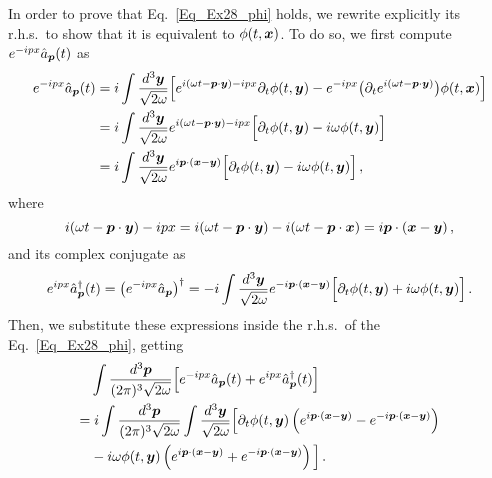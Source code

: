 \begin{sol}
    In order to prove that Eq.~\eqref{Eq_Ex28_phi} holds, we rewrite explicitly its r.h.s.~to show that it is equivalent to $\phi(t,\boldsymbol{x})$. To do so, we first compute $e^{-ipx} \hat{a}_{\boldsymbol{p}}(t)$ as
    \begin{equation}
    \begin{split}
        e^{-ipx} \hat{a}_{\boldsymbol{p}}(t) 
        = &\; i \int \frac{d^3 \boldsymbol{y}}{\sqrt{2\omega}} \Big[e^{i(\omega t - \boldsymbol{p} \cdot \boldsymbol{y}) - ipx} \partial_t  \phi(t,\boldsymbol{y}) - e^{- ipx}\big(\partial_t e^{i(\omega t - \boldsymbol{p} \cdot \boldsymbol{y})}\big) \phi(t,\boldsymbol{x})\Big] \\
        = &\; i \int \frac{d^3 \boldsymbol{y}}{\sqrt{2\omega}} e^{i(\omega t - \boldsymbol{p} \cdot \boldsymbol{y}) - ipx} \Big[\partial_t  \phi(t,\boldsymbol{y}) - i \omega \phi(t,\boldsymbol{y})\Big] \\
        = &\; i \int \frac{d^3 \boldsymbol{y}}{\sqrt{2\omega}} e^{i\boldsymbol{p} \cdot(\boldsymbol{x} - \boldsymbol{y})} \Big[\partial_t  \phi(t,\boldsymbol{y}) - i \omega \phi(t,\boldsymbol{y})\Big] \, ,
    \end{split}
    \end{equation}
    where
    \begin{equation}
        i(\omega t - \boldsymbol{p} \cdot \boldsymbol{y}) - ipx = i(\omega t - \boldsymbol{p} \cdot \boldsymbol{y}) - i(\omega t - \boldsymbol{p} \cdot \boldsymbol{x}) = i\boldsymbol{p} \cdot(\boldsymbol{x} - \boldsymbol{y}) \, ,
    \end{equation}
    and its complex conjugate as
    \begin{equation}
        e^{ipx} \hat{a}^\dagger_{\boldsymbol{p}}(t)
        = \big(e^{-ipx} \hat{a}_{\boldsymbol{p}} \big)^\dagger
        = - i \int \frac{d^3 \boldsymbol{y}}{\sqrt{2\omega}} e^{-i\boldsymbol{p} \cdot(\boldsymbol{x} - \boldsymbol{y})} \Big[\partial_t  \phi(t,\boldsymbol{y}) + i \omega \phi(t,\boldsymbol{y})\Big] \, .
    \end{equation}
    Then, we substitute these expressions inside the r.h.s.~of the Eq.~\eqref{Eq_Ex28_phi}, getting 
    \begin{equation}
    \begin{split}
        & \int \frac{d^3 \boldsymbol{p}}{(2\pi)^3 \sqrt{2\omega}} \Big[e^{-ipx} \hat{a}_{\boldsymbol{p}}(t) + e^{ipx} \hat{a}^\dagger_{\boldsymbol{p}}(t)\Big] \\
        = &\; i \int \frac{d^3 \boldsymbol{p}}{(2\pi)^3 \sqrt{2\omega}} \int \frac{d^3 \boldsymbol{y}}{\sqrt{2\omega}} \Big[\partial_t  \phi(t,\boldsymbol{y})\left(e^{i\boldsymbol{p} \cdot(\boldsymbol{x} - \boldsymbol{y})} - e^{-i\boldsymbol{p} \cdot(\boldsymbol{x} - \boldsymbol{y})}\right) \\
        & - i \omega \phi(t,\boldsymbol{y}) \left(e^{i\boldsymbol{p} \cdot(\boldsymbol{x} - \boldsymbol{y})} + e^{-i\boldsymbol{p} \cdot(\boldsymbol{x} -\boldsymbol{y})}\right)\Big] \, . 
    \end{split}
    \end{equation}

\end{sol}
